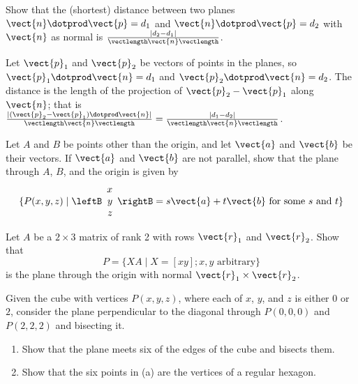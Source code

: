 \begin{multicols}{2}
\begin{ex}
Show that the (shortest) distance between two planes $\vect{n} \dotprod \vect{p} = d_{1}$ and $\vect{n} \dotprod \vect{p} = d_{2}$ with $\vect{n}$ as normal is $\frac{|d_{2} - d_{1}|}{\vectlength \vect{n} \vectlength}$.

\begin{sol}
Let $\vect{p}_{1}$ and $\vect{p}_{2}$ be vectors of points in the planes, so $\vect{p}_{1} \dotprod \vect{n} = d_{1}$ and $\vect{p}_{2} \dotprod \vect{n} = d_{2}$. The distance is the length of the projection of $\vect{p}_{2} - \vect{p}_{1}$ along $\vect{n}$; that is $\frac{|(\vect{p}_{2} - \vect{p}_{1}) \dotprod \vect{n}|}{\vectlength \vect{n} \vectlength} = \frac{|d_{1} - d_{2}|}{\vectlength \vect{n} \vectlength}$.
\end{sol}
\end{ex}


\begin{ex}
Let $A$ and $B$ be points other than the origin, and let $\vect{a}$ and $\vect{b}$ be their vectors. If $\vect{a}$ and $\vect{b}$ are not parallel, show that the plane through $A$, $B$, and the origin is given by
\begin{equation*}
\{P(x, y, z) \mid
\leftB
\begin{array}{r}
x\\
y\\
z
\end{array}
\rightB = s\vect{a} + t\vect{b} \mbox{ for some } s \mbox{ and } t \} 
\end{equation*}
\end{ex} 

\begin{ex}
Let $A$ be a $2 \times 3$ matrix of rank 2 with rows $\vect{r}_{1}$ and $\vect{r}_{2}$. Show that 
\begin{equation*}
P = \{XA \mid X = [x y]; x, y \mbox{ arbitrary}\}
\end{equation*}
 is the plane through the origin with normal $\vect{r}_{1} \times \vect{r}_{2}$. 
\end{ex}

\begin{ex}
Given the cube with vertices $P(x, y, z)$, where each of $x$, $y$, and $z$ is either $0$ or $2$, consider the plane perpendicular to the diagonal through $P(0, 0, 0)$ and $P(2, 2, 2)$ and bisecting it.


\begin{enumerate}[label={\alph*.}]
\item Show that the plane meets six of the edges of the cube and bisects them.

\item Show that the six points in (a) are the vertices of a regular hexagon.

\end{enumerate}
\end{ex}
\end{multicols}
